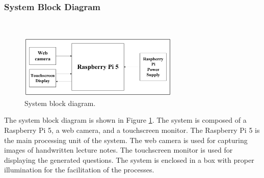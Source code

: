 \documentclass[conference]{IEEEtran}
\begin{document}
        \subsubsection{System Block Diagram}
            \hfill \\
            \vspace{-0.6cm}
            \begin{figure}[H]
                \centerline{\includegraphics[width=3in]{blockdiag.png}}
                \vspace{-0.3cm}
                \caption{System block diagram.} 
                \label{blockdiagram}
            \end{figure} 
            \vspace{-0.4cm}
            \indent The system block diagram is shown in Figure 
            \ref{blockdiagram}. The system is composed of a 
            Raspberry Pi 5, a web camera, and a 
            touchscreen monitor. The Raspberry Pi 5 is the main 
            processing unit of the system. The web camera is 
            used for capturing images of handwritten lecture notes. 
            The touchscreen monitor is used for displaying the 
            generated questions. The system is enclosed in a box 
            with proper illumination for the facilitation of the 
            processes.
        \vspace{0.2cm}
\end{document}
